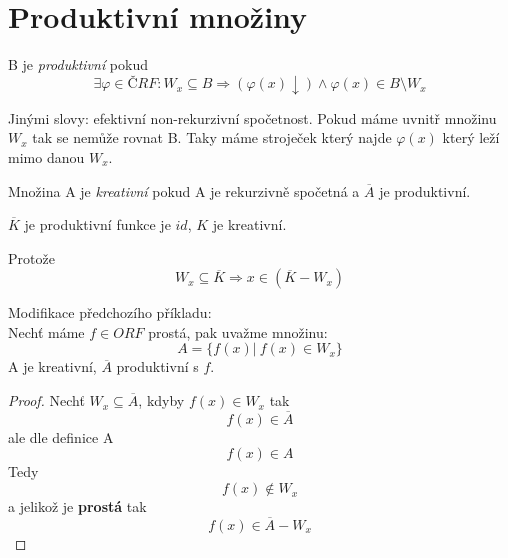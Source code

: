 \section{\texorpdfstring{Produktivní množiny}{Produktivní množiny}}
\vspace{5mm}
\large

\begin{definition}
	B je \emph{produktivní} pokud
	\[ \exists \varphi \in ČRF: W_x \subseteq B \Rightarrow (\varphi(x) \downarrow) \land \varphi(x) \in B \setminus W_x \]

	Jinými slovy: efektivní non-rekurzivní spočetnost. Pokud máme uvnitř množinu $W_x$ tak se nemůže rovnat B.
	Taky máme stroječek který najde $\varphi(x)$ který leží mimo danou $W_x$.
\end{definition}

\begin{definition}
	Množina A je \emph{kreativní} pokud A je rekurzivně spočetná a $\overline{A}$ je produktivní.
\end{definition}

\begin{example}[K]
	$\overline{K}$ je produktivní funkce je $id$, $K$ je kreativní.

	Protože
	\[ W_x \subseteq \overline{K} \Rightarrow x \in (\overline{K} - W_x) \]
\end{example}

\begin{theorem}[Modifikace K]
	Modifikace předchozího příkladu:\\
	Nechť máme $f \in ORF$ prostá, pak uvažme množinu:
	\[ A = \{ f(x)| \ f(x) \in W_x \} \]
	A je kreativní, $\overline{A}$ produktivní s $f$.
\end{theorem}
\begin{proof}
	Nechť $W_x \subseteq \overline{A}$, kdyby $f(x) \in W_x$ tak
	\[ f(x) \in \overline{A} \]
	ale dle definice A
	\[ f(x) \in A \]
	Tedy
	\[ f(x) \notin W_x \]
	a jelikož je \textbf{prostá} tak
	\[ f(x) \in \overline{A} - W_x \]
\end{proof}

